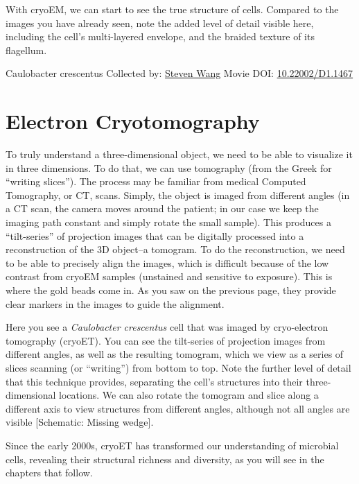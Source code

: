 \documentclass[]{tufte-book}
\begin{document}
With cryoEM, we can start to see the true structure of cells. Compared to the images you have already seen, note the added level of detail visible here, including the cell's multi-layered envelope, and the braided texture of its flagellum.



\hypertarget{htmlwidget-80480abde5088a9efc6c}{}

\label{fig:1-5}Caulobacter crescentus Collected by: \protect\hyperlink{steven_wang}{Steven Wang} Movie DOI: \href{https://doi.org/10.22002/D1.1467}{10.22002/D1.1467}

\hypertarget{electron-cryotomography}{%
\section{Electron Cryotomography}\label{electron-cryotomography}}

To truly understand a three-dimensional object, we need to be able to visualize it in three dimensions. To do that, we can use tomography (from the Greek for ``writing slices''). The process may be familiar from medical Computed Tomography, or CT, scans. Simply, the object is imaged from different angles (in a CT scan, the camera moves around the patient; in our case we keep the imaging path constant and simply rotate the small sample). This produces a ``tilt-series'' of projection images that can be digitally processed into a reconstruction of the 3D object--a tomogram. To do the reconstruction, we need to be able to precisely align the images, which is difficult because of the low contrast from cryoEM samples (unstained and sensitive to exposure). This is where the gold beads come in. As you saw on the previous page, they provide clear markers in the images to guide the alignment.

Here you see a \emph{Caulobacter crescentus} cell that was imaged by cryo-electron tomography (cryoET). You can see the tilt-series of projection images from different angles, as well as the resulting tomogram, which we view as a series of slices scanning (or ``writing'') from bottom to top. Note the further level of detail that this technique provides, separating the cell's structures into their three-dimensional locations. We can also rotate the tomogram and slice along a different axis to view structures from different angles, although not all angles are visible {[}Schematic: Missing wedge{]}.

Since the early 2000s, cryoET has transformed our understanding of microbial cells, revealing their structural richness and diversity, as you will see in the chapters that follow.
\end{document}
